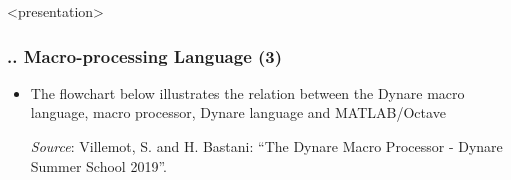 \documentclass[11pt,aspectratio=169]{beamer}
\begin{document}
\begin{frame}<presentation>
	\frametitle{{\thesection.\thesubsection.\thesubsubsection} Macro-processing Language (3)}
	\begin{itemize}
		\item The flowchart below illustrates the relation between the Dynare macro language, macro processor, Dynare language and MATLAB/Octave
		\begin{figure}
			\centering
		\end{figure}
	\hspace{1.75cm} \tiny{\textit{Source}: Villemot, S. and H. Bastani: ``The Dynare Macro Processor - Dynare Summer School 2019''.}
	\end{itemize}
\end{frame}
\end{document}
